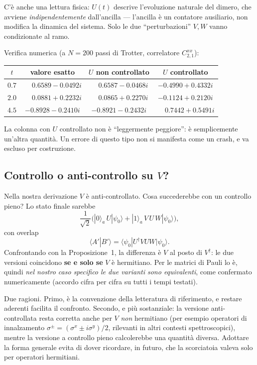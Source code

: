 \documentclass[11pt,a4paper]{article}
\begin{document}
C'è anche una lettura fisica: $U(t)$ descrive l'evoluzione naturale del dimero, che avviene
\emph{indipendentemente} dall'ancilla --- l'ancilla è un contatore ausiliario, non modifica la
dinamica del sistema. Solo le due ``perturbazioni'' $V,W$ vanno condizionate al ramo.

Verifica numerica (a $N=200$ passi di Trotter, correlatore $C_{2,1}^{xx}$):

\begin{center}
\begin{tabular}{cccc}
\toprule
$t$ & valore esatto & $U$ non controllato & $U$ controllato \\
\midrule
$0.7$ & $\phantom{-}0.6589-0.0492i$ & $\phantom{-}0.6587-0.0468i$ & $-0.4990+0.4332i$ \\
$2.0$ & $\phantom{-}0.0881+0.2232i$ & $\phantom{-}0.0865+0.2270i$ & $-0.1124+0.2120i$ \\
$4.5$ & $-0.8928-0.2410i$ & $-0.8921-0.2432i$ & $\phantom{-}0.7442+0.5491i$ \\
\bottomrule
\end{tabular}
\end{center}

\noindent
La colonna con $U$ controllato non è ``leggermente peggiore'': è semplicemente un'altra
quantità. Un errore di questo tipo non si manifesta come un crash, e va escluso per costruzione.

\subsection{Controllo o anti-controllo su $V$?}

Nella nostra derivazione $V$ è anti-controllato. Cosa succederebbe con un controllo pieno? Lo
stato finale sarebbe
\begin{equation}
\frac{1}{\sqrt2}\Big(|0\rangle_a\,U|\psi_0\rangle+|1\rangle_a\,V\,U\,W|\psi_0\rangle\Big),
\end{equation}
con overlap
\begin{equation}
\langle A'|B'\rangle=\langle\psi_0|U^\dagger V U W|\psi_0\rangle .
\end{equation}
Confrontando con la Proposizione~1, la differenza è $V$ al posto di $V^\dagger$: le due versioni
coincidono \textbf{se e solo se} $V$ è hermitiano. Per le matrici di Pauli lo è, quindi
\emph{nel nostro caso specifico le due varianti sono equivalenti}, come confermato
numericamente (accordo cifra per cifra su tutti i tempi testati).

\begin{warnbox}
Due ragioni. Primo, è la convenzione della letteratura di riferimento, e restare aderenti
facilita il confronto. Secondo, e più sostanziale: la versione anti-controllata resta corretta
anche per $V$ \emph{non} hermitiano (per esempio operatori di innalzamento
$\sigma^\pm=(\sigma^x\pm i\sigma^y)/2$, rilevanti in altri contesti spettroscopici), mentre la
versione a controllo pieno calcolerebbe una quantità diversa. Adottare la forma generale evita
di dover ricordare, in futuro, che la scorciatoia valeva solo per operatori hermitiani.
\end{warnbox}
\end{document}
